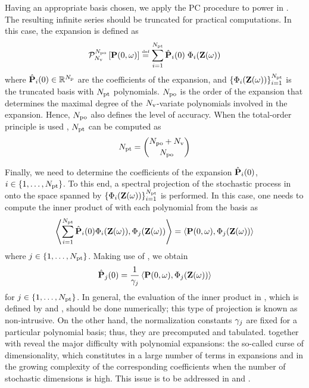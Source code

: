 Having an appropriate basis chosen, we apply the PC procedure to power in . The resulting infinite series should be truncated for practical computations. In this case, the expansion is defined as
\begin{equation} \elabel{pc-expansion}
  \oPC{\vars}{\pcorder}{\vP(0, \o)} \eqdef \sum_{i = 1}^{\pcterms} \pcc{\vP}_i(0) \; \pcb_i(\vZ(\o))
\end{equation}
where $\hat{\mathbf{P}}_i(0) \in \mathbb{R}^{N_\text{p}}$ are the coefficients of the expansion, and $\{ \Phi_i(\mathbf{Z}(\omega)) \}_{i = 1}^{{N_\text{pt}}}$ is the truncated basis with ${N_\text{pt}}$ polynomials. ${N_\text{po}}$ is the order of the expansion that determines the maximal degree of the ${N_\text{v}}$-variate polynomials involved in the expansion. Hence, ${N_\text{po}}$ also defines the level of accuracy. When the total-order principle is used \cite{eldred2009}, ${N_\text{pt}}$ can be computed as
\begin{equation} \elabel{pc-terms}
  \pcterms = {\pcorder + \vars \choose \pcorder}
\end{equation}

Finally, we need to determine the coefficients of the expansion $\hat{\mathbf{P}}_i(0)$, $i \in \{ 1, \dotsc, {N_\text{pt}} \}$. To this end, a spectral projection of the stochastic process in  onto the space spanned by $\{ \Phi_i(\mathbf{Z}(\omega)) \}_{i = 1}^{{N_\text{pt}}}$ is performed. In this case, one needs to compute the inner product of  with each polynomial from the basis as
\[
  \oInner{\sum_{i=1}^{\pcterms} \pcc{\vP}_i(0) \pcb_i(\vZ(\o))}{\pcb_j(\vZ(\o))} = \oInner{\vP(0, \o)}{\pcb_j(\vZ(\o))}
\]
where $j \in \{ 1, \dotsc, {N_\text{pt}} \}$. Making use of , we obtain
\begin{equation} \elabel{pc-coefficients}
  \pcc{\vP}_j(0) = \frac{1}{\pcn_j} \oInner{\vP(0, \o)}{\pcb_j(\vZ(\o))}
\end{equation}
for $j \in \{ 1, \dotsc, {N_\text{pt}} \}$. In general, the evaluation of the inner product in , which is defined by  and , should be done numerically; this type of projection is known as non-intrusive. On the other hand, the normalization constants $\gamma_j$ are fixed for a particular polynomial basis; thus, they are precomputed and tabulated.  together with  reveal the major difficulty with polynomial expansions: the so-called curse of dimensionality, which constitutes in a large number of terms in expansions and in the growing complexity of the corresponding coefficients when the number of stochastic dimensions is high. This issue is to be addressed in  and .

